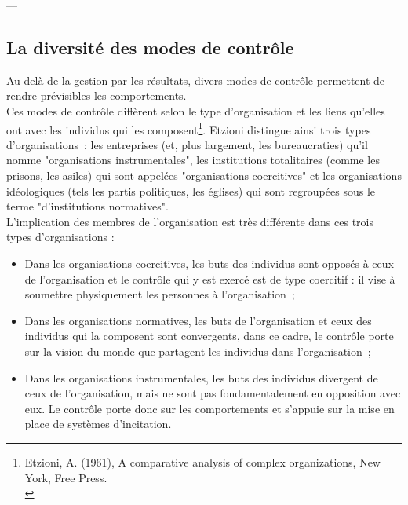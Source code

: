 \documentclass{kaobook}
\begin{document}
---\\

\subsection{La diversité des modes de contrôle}
\label{sec:org6a03ae1}
Au-delà de la gestion par les résultats, divers modes de contrôle permettent de rendre prévisibles les comportements.\\

Ces modes de contrôle diffèrent selon le type d'organisation et les liens qu'elles ont avec les individus qui les composent\footnote{Etzioni, A. (1961), A comparative analysis of complex organizations, New York, Free Press.\\}. Etzioni distingue ainsi trois types d'organisations : les entreprises (et, plus largement, les bureaucraties) qu'il nomme "organisations instrumentales", les institutions totalitaires (comme les prisons, les asiles) qui sont appelées "organisations coercitives" et les organisations idéologiques (tels les partis politiques, les églises) qui sont regroupées sous le terme "d'institutions normatives".\\

L'implication des membres de l'organisation est très différente dans ces trois types d'organisations :\\
\begin{itemize}
\item Dans les organisations coercitives, les buts des individus sont opposés à ceux de l'organisation et le contrôle qui y est exercé est de type coercitif : il vise à soumettre physiquement les personnes à l'organisation ;\\
\item Dans les organisations normatives, les buts de l'organisation et ceux des individus qui la composent sont convergents, dans ce cadre, le contrôle porte sur la vision du monde que partagent les individus dans l'organisation ;\\
\item Dans les organisations instrumentales, les buts des individus divergent de ceux de l'organisation, mais ne sont pas fondamentalement en opposition avec eux. Le contrôle porte donc sur les comportements et s'appuie sur la mise en place de systèmes d'incitation.\\
\end{itemize}
\end{document}
